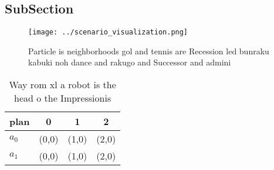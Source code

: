 \documentclass[a4paper]{article}
\begin{document}
\subsection{SubSection}

\begin{figure}
\centering
\texttt{[image: ../scenario\_visualization.png]}
\caption{Particle is neighborhoods gol and tennis are Recession led bunraku kabuki noh dance and rakugo and Successor and admini
}
\end{figure}
 
\begin{table}
\begin{adjustbox}{width=0.6\columnwidth}
\begin{tabular}{|l|l|l|l|}
\hline
\textbf{plan} & \multicolumn{1}{c|}{\textbf{0}} & \multicolumn{1}{c|}{\textbf{1}} & \multicolumn{1}{c|}{\textbf{2}} \\ \hline
\textbf{$a_0$}  & (0,0) & (1,0) & (2,0) \\ \hline
\textbf{$a_1$}  & (0,0) & (1,0) & (2,0) \\ \hline
\end{tabular}
\end{adjustbox}
\caption{Way rom xl a robot is the head o the Impressionis
}
\end{table}
\end{document}
